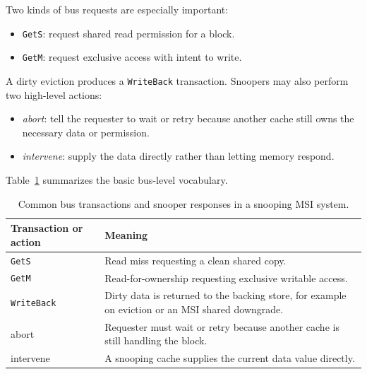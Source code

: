 Two kinds of bus requests are especially important:
\begin{itemize}
    \item \texttt{GetS}: request shared read permission for a block.
    \item \texttt{GetM}: request exclusive access with intent to write.
\end{itemize}
A dirty eviction produces a \texttt{WriteBack} transaction.
Snoopers may also perform two high-level actions:
\begin{itemize}
    \item \textit{abort}: tell the requester to wait or retry because another cache still owns the necessary data or permission.
    \item \textit{intervene}: supply the data directly rather than letting memory respond.
\end{itemize}
Table~\ref{tab:mp-msi-bus-actions} summarizes the basic bus-level vocabulary.
\begin{table}[t]
    \centering
    \renewcommand{\arraystretch}{1.15}
    \begin{tabular}{|l|p{4.2in}|}
        \hline
        Transaction or action & Meaning                                                                         \\
        \hline
        \texttt{GetS}         & Read miss requesting a clean shared copy.                                       \\
        \hline
        \texttt{GetM}         & Read-for-ownership requesting exclusive writable access.                        \\
        \hline
        \texttt{WriteBack}    & Dirty data is returned to the backing store, for example on eviction or an MSI shared downgrade. \\
        \hline
        abort                 & Requester must wait or retry because another cache is still handling the block. \\
        \hline
        intervene             & A snooping cache supplies the current data value directly.                      \\
        \hline
    \end{tabular}
    \caption{Common bus transactions and snooper responses in a snooping MSI system.}
    \label{tab:mp-msi-bus-actions}
\end{table}


